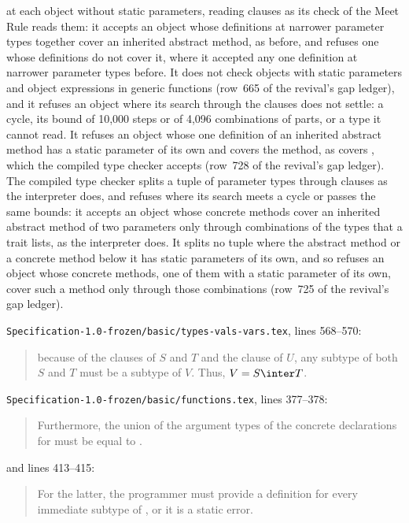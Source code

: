 \begin{description}
at each object without static parameters, reading  clauses as its
check of the Meet Rule reads them: it accepts an object whose definitions at
narrower parameter types together cover an inherited abstract method, as before,
and refuses one whose definitions do not cover it, where it accepted any one
definition at narrower parameter types before.
It does not check objects with static parameters and object expressions in
generic functions (row~665 of the revival's gap ledger), and it
refuses an object where its search through the  clauses
does not settle: a cycle, its bound of 10,000 steps or of 4,096 combinations of
parts, or a type it cannot read.
It refuses an object whose one definition of an inherited abstract method has a
static parameter of its own and covers the method, as
covers , which the compiled type
checker accepts (row~728 of the revival's gap ledger).
The compiled type checker splits a tuple of parameter types through
 clauses as the interpreter does, and refuses where its search
meets a cycle or passes the same bounds: it accepts an object whose concrete
methods cover an inherited abstract method of two parameters only through
combinations of the types that a trait lists, as the interpreter does.
It splits no tuple where the abstract method or a concrete method below it has
static parameters of its own, and so refuses an object whose concrete methods,
one of them with a static parameter of its own, cover such a method only
through those combinations (row~725 of the revival's gap ledger).
\item[Original text] \nolinkurl{Specification-1.0-frozen/basic/types-vals-vars.tex},
lines 568--570:
\begin{quote}
because of the  clauses of $S$ and $T$ and the 
clause of $U$, any subtype of both $S$ and $T$ must be a subtype of $V$.  Thus,
$V = S \inter T$.
\end{quote}
\nolinkurl{Specification-1.0-frozen/basic/functions.tex}, lines 377--378:
\begin{quote}
Furthermore, the union of the argument types of the concrete declarations for
 must be equal to .
\end{quote}
and lines 413--415:
\begin{quote}
For the latter, the programmer must provide a definition for every immediate
subtype of , or it is a static error.

\end{quote}
\end{description}
